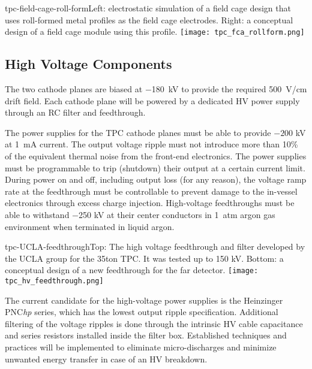 \begin{cdrfigure}{tpc-field-cage-roll-form}{Left: electrostatic simulation of a field cage design that uses roll-formed metal profiles as the field cage electrodes.  Right: a conceptual design of a field cage module using this profile.}
\texttt{[image: tpc\_fca\_rollform.png]}
\end{cdrfigure}


\subsection{High Voltage Components}  
\label{subsec:fd-ref-hv}
   
The two cathode planes are biased at $-$180~kV to provide the required
500~V/cm drift field. Each cathode plane will be powered by a
dedicated HV power supply through an RC filter and feedthrough.

The power supplies for the TPC cathode planes must be able to provide
$-200$ kV at 1~mA current. The output voltage ripple must not
introduce more than 10\% of the equivalent thermal noise from the
front-end electronics.  The power supplies must be programmable to
trip (shutdown) their output at a certain current limit.  During power
on and off, including output loss (for any reason), the voltage ramp
rate at the feedthrough must be controllable to prevent damage to the
in-vessel electronics through excess charge injection.  High-voltage
feedthroughs must be able to withstand $-$250 kV at their center
conductors in 1~atm argon gas environment when terminated in liquid
argon.

\begin{cdrfigure}{tpc-UCLA-feedthrough}{Top: The high voltage feedthrough and filter developed by the UCLA 
group for the 35ton TPC.  It was tested up to 150 kV.  Bottom: a conceptual design of a new feedthrough for the far detector.}
\texttt{[image: tpc\_hv\_feedthrough.png]}
\end{cdrfigure}

The current candidate for the high-voltage power supplies is the
Heinzinger PNC{\it hp} series, which has the lowest output ripple
specification.  Additional filtering of the voltage ripples is done
through the intrinsic HV cable capacitance and series resistors
installed inside the filter box. Established techniques and practices
will be implemented to eliminate micro-discharges and minimize
unwanted energy transfer in case of an HV breakdown.
  
